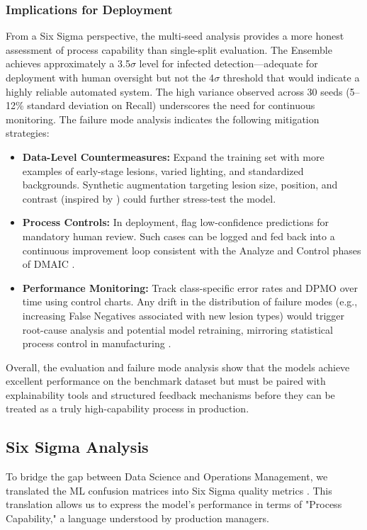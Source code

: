\documentclass[12pt,a4paper]{article}
\begin{document}
\subsubsection{Implications for Deployment}
From a Six Sigma perspective, the multi-seed analysis provides a more honest assessment of process capability than single-split evaluation. The Ensemble achieves approximately a 3.5$\sigma$ level for infected detection---adequate for deployment with human oversight but not the 4$\sigma$ threshold that would indicate a highly reliable automated system. The high variance observed across 30 seeds (5--12\% standard deviation on Recall) underscores the need for continuous monitoring. The failure mode analysis indicates the following mitigation strategies:
\begin{itemize}
    \item \textbf{Data-Level Countermeasures:} Expand the training set with more examples of early-stage lesions, varied lighting, and standardized backgrounds. Synthetic augmentation targeting lesion size, position, and contrast (inspired by \citealp{Shorten2019, MORENOBAREA2020113696}) could further stress-test the model.
    \item \textbf{Process Controls:} In deployment, flag low-confidence predictions for mandatory human review. Such cases can be logged and fed back into a continuous improvement loop consistent with the Analyze and Control phases of DMAIC \citep{10.1108/TQM-11-2023-0361, Tsung2023}.
    \item \textbf{Performance Monitoring:} Track class-specific error rates and DPMO over time using control charts. Any drift in the distribution of failure modes (e.g., increasing False Negatives associated with new lesion types) would trigger root-cause analysis and potential model retraining, mirroring statistical process control in manufacturing \citep{montgomery2020introduction}.
\end{itemize}

Overall, the evaluation and failure mode analysis show that the models achieve excellent performance on the benchmark dataset but must be paired with explainability tools and structured feedback mechanisms before they can be treated as a truly high-capability process in production.

\subsection{Six Sigma Analysis}
To bridge the gap between Data Science and Operations Management, we translated the ML confusion matrices into Six Sigma quality metrics \citep{montgomery2020introduction, Tsung2023}. This translation allows us to express the model's performance in terms of "Process Capability," a language understood by production managers.
\end{document}
